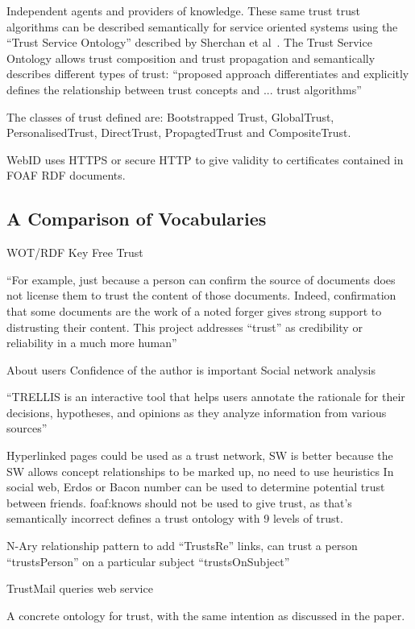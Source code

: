 \documentclass{acm_proc_article-sp}
\begin{document}
Independent agents and providers of knowledge. These same trust trust algorithms can be described semantically for service oriented systems using the ``Trust Service Ontology'' described by Sherchan et al~\cite{sherchan_trust_2010}. The Trust Service Ontology allows trust composition and trust propagation and semantically describes different types of trust: ``proposed approach differentiates and explicitly
defines the relationship between trust concepts and ... trust algorithms''

The classes of trust defined are: Bootstrapped Trust, GlobalTrust, PersonalisedTrust, DirectTrust, PropagtedTrust and CompositeTrust.

WebID uses HTTPS or secure HTTP to give validity to certificates contained in FOAF RDF documents.

\subsection{A Comparison of Vocabularies}
WOT/RDF
Key Free Trust

``For example, just because a person can confirm the source of documents does not license them to trust the content of those documents. Indeed, confirmation that some documents are the work of a noted forger gives strong support to distrusting their content. This project addresses ``trust'' as credibility or reliability in a much more human''

About users
Confidence of the author is important
Social network analysis

``TRELLIS is an interactive tool that helps users annotate the
rationale for their decisions, hypotheses, and opinions as they analyze information from various sources''\cite{gil_trusting_2002}

Hyperlinked pages could be used as a trust network, SW is better because the SW allows concept relationships to be marked up, no need to use heuristics
In social web, Erdos or Bacon number can be used to determine potential trust between friends.
foaf:knows should not be used to give trust, as that's semantically incorrect
defines a trust ontology with 9 levels of trust.

N-Ary relationship pattern to add ``TrustsRe'' links, can trust a person ``trustsPerson'' on a particular subject ``trustsOnSubject''

TrustMail queries web service 
\cite{golbeck_trust_2003}

A concrete ontology for trust, with the same intention as discussed in the paper.
\cite{jennifer_golbeck_trust_2013}
\end{document}
